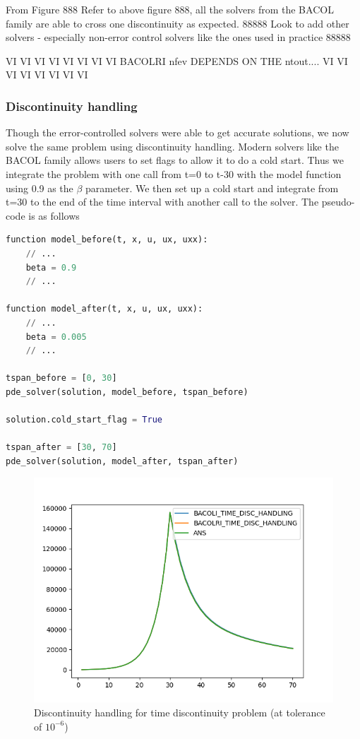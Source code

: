 \documentclass{article}
\begin{document}
From Figure 888 Refer to above figure 888, all the solvers from the BACOL family are able to cross one discontinuity as expected. 
88888 Look to add other solvers - especially non-error control solvers like the ones used in practice 88888


VI VI VI VI VI VI VI VI
BACOLRI nfev DEPENDS ON THE ntout....
VI VI VI VI VI VI VI VI


\subsubsection{Discontinuity handling}
Though the error-controlled solvers were able to get accurate solutions, we now solve the same problem using discontinuity handling. Modern solvers like the BACOL family allows users to set flags to allow it to do a cold start. Thus we integrate the problem with one call from t=0 to t-30 with the model function using 0.9 as the $\beta$ parameter. We then set up a cold start and integrate from t=30 to the end of the time interval with another call to the solver. The pseudo-code is as follows

\begin{minipage}{\linewidth}
\begin{lstlisting}[language=Python]
function model_before(t, x, u, ux, uxx):
    // ...
    beta = 0.9
    // ...
    
function model_after(t, x, u, ux, uxx):
    // ...
    beta = 0.005
    // ...
 
tspan_before = [0, 30]
pde_solver(solution, model_before, tspan_before)

solution.cold_start_flag = True

tspan_after = [30, 70]
pde_solver(solution, model_after, tspan_after)

\end{lstlisting}
\end{minipage}

\begin{figure}[H]
\centering
\includegraphics[width=0.7\linewidth]{./figures/pde_time_disc_disc_hand}
\caption{Discontinuity handling for time discontinuity problem (at tolerance of $10^{-6}$)}
\label{fig:pde_time_disc_disc_hand}
\end{figure}
\end{document}
